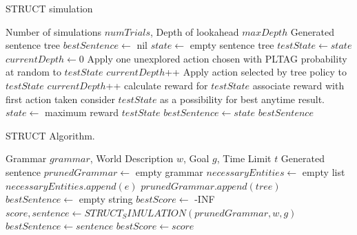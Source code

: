 \begin{algorithm}
\caption{STRUCT simulation}\label{uct-code}
\begin{algorithmic}[1]
\REQUIRE Number of simulations $numTrials$, Depth of lookahead $maxDepth$
\ENSURE Generated sentence tree
\STATE $bestSentence \gets$ nil
\STATE $state \gets$ empty sentence tree
		\STATE $testState \gets state$
		\STATE $currentDepth \gets 0$
			\STATE Apply one unexplored action chosen
                        with PLTAG probability at random to $testState$
			\STATE $currentDepth$++
		\ENDIF
			\STATE Apply action selected by tree
                        policy to $testState$
			\STATE $currentDepth$++
		\ENDWHILE
		\STATE calculate reward for $testState$
		\STATE associate reward with first action taken
			\STATE consider $testState$ as a possibility for best anytime result.
		\ENDIF
	\ENDFOR
	\STATE $state \gets$ maximum reward $testState$
		\STATE $bestSentence \gets state$
	\ENDIF
\ENDWHILE
\RETURN $bestSentence$
\end{algorithmic}
\end{algorithm}

\begin{algorithm}
\caption{STRUCT Algorithm.} \label{struct-alg}
\begin{algorithmic}[1]
\REQUIRE Grammar $grammar$, World Description $w$, Goal $g$, Time Limit $t$
\ENSURE Generated sentence
\STATE $prunedGrammar \gets$ empty grammar
\STATE $necessaryEntities \gets$ empty list
		\STATE $necessaryEntities.append(e)$
	\ENDIF
\ENDFOR
{}
		\STATE $prunedGrammar.append(tree)$
	\ENDIF
\ENDFOR
\STATE $bestSentence \gets$ empty string
\STATE $bestScore \gets$ -INF
	\STATE $score, sentence \gets STRUCT_SIMULATION(prunedGrammar, w, g)$
		\STATE $bestSentence \gets sentence$
		\STATE $bestScore \gets score$
	\ENDIF
\ENDWHILE
\end{algorithmic}
\end{algorithm}